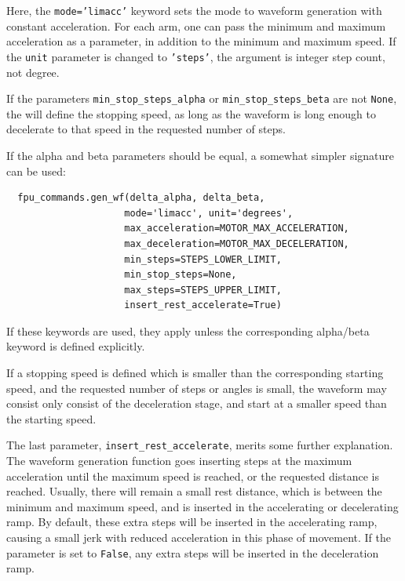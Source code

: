 \documentclass[fontsize=12,a4paper]{scrreprt}
\begin{document}
Here, the \texttt{mode='limacc'} keyword sets the mode to waveform
generation with constant acceleration. For each arm, one can pass the
minimum and maximum acceleration as a parameter, in addition to the
minimum and maximum speed. If the \texttt{unit} parameter is changed
to \texttt{'steps'}, the argument is integer step count, not degree.

If the parameters \texttt{min\_stop\_steps\_alpha} or
\texttt{min\_stop\_steps\_beta} are not \texttt{None}, the will define
the stopping speed, as long as the waveform is long enough to
decelerate to that speed in the requested number of steps.

If the alpha and beta parameters should be equal, a somewhat
simpler signature can be used:

\begin{verbatim}
  fpu_commands.gen_wf(delta_alpha, delta_beta,
                     mode='limacc', unit='degrees',
                     max_acceleration=MOTOR_MAX_ACCELERATION,
                     max_deceleration=MOTOR_MAX_DECELERATION,
                     min_steps=STEPS_LOWER_LIMIT,
                     min_stop_steps=None,
                     max_steps=STEPS_UPPER_LIMIT,
                     insert_rest_accelerate=True)
\end{verbatim}

If these keywords are used, they apply unless the corresponding
alpha/beta keyword is defined explicitly.

If a stopping speed is defined which is smaller than the corresponding
starting speed, and the requested number of steps or angles is small,
the waveform may consist only consist of the deceleration stage, and
start at a smaller speed than the starting speed.



The last parameter, \texttt{insert\_rest\_accelerate}, merits some
further explanation. The waveform generation function goes inserting
steps at the maximum acceleration until the maximum speed is reached,
or the requested distance is reached. Usually, there will remain a
small rest distance, which is between the minimum and maximum speed,
and is inserted in the accelerating or decelerating ramp.  By default,
these extra steps will be inserted in the accelerating ramp, causing a
small jerk with reduced acceleration in this phase of movement. If the
parameter is set to \texttt{False}, any extra steps will be inserted in
the deceleration ramp.
\end{document}
